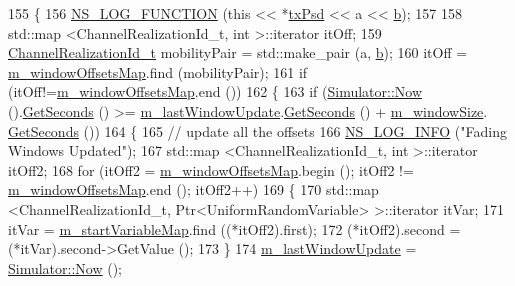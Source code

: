 \begin{DoxyCode}
155 \{
156   \hyperlink{log-macros-disabled_8h_a90b90d5bad1f39cb1b64923ea94c0761}{NS\_LOG\_FUNCTION} (\textcolor{keyword}{this} << *\hyperlink{lte__link__budget_8m_a684fe3101a5e48a5fcc57cab8dbcd1aa}{txPsd} << a << \hyperlink{buildings__pathloss_8m_a21ad0bd836b90d08f4cf640b4c298e7c}{b});
157   
158   std::map <ChannelRealizationId\_t, int >::iterator itOff;
159   \hyperlink{classns3_1_1TraceFadingLossModel_a538fb5e148b837e46a2da767346839d4}{ChannelRealizationId\_t} mobilityPair = std::make\_pair (a,
      \hyperlink{buildings__pathloss_8m_a21ad0bd836b90d08f4cf640b4c298e7c}{b});
160   itOff = \hyperlink{classns3_1_1TraceFadingLossModel_aba701b6e63395fd422f72cd3cd08564a}{m\_windowOffsetsMap}.find (mobilityPair);
161   \textcolor{keywordflow}{if} (itOff!=\hyperlink{classns3_1_1TraceFadingLossModel_aba701b6e63395fd422f72cd3cd08564a}{m\_windowOffsetsMap}.end ())
162     \{
163       \textcolor{keywordflow}{if} (\hyperlink{classns3_1_1Simulator_ac3178fa975b419f7875e7105be122800}{Simulator::Now} ().\hyperlink{classns3_1_1Time_a8f20d5c3b0902d7b4320982f340b57c8}{GetSeconds} () >= 
      \hyperlink{classns3_1_1TraceFadingLossModel_a3e52ec88812339f8ecf070b9f7645a69}{m\_lastWindowUpdate}.\hyperlink{classns3_1_1Time_a8f20d5c3b0902d7b4320982f340b57c8}{GetSeconds} () + \hyperlink{classns3_1_1TraceFadingLossModel_ad872ee7d3fec738e41519fa6562c48fb}{m\_windowSize}.
      \hyperlink{classns3_1_1Time_a8f20d5c3b0902d7b4320982f340b57c8}{GetSeconds} ())
164         \{
165           \textcolor{comment}{// update all the offsets}
166           \hyperlink{group__logging_gafbd73ee2cf9f26b319f49086d8e860fb}{NS\_LOG\_INFO} (\textcolor{stringliteral}{"Fading Windows Updated"});
167           std::map <ChannelRealizationId\_t, int >::iterator itOff2;
168           \textcolor{keywordflow}{for} (itOff2 = \hyperlink{classns3_1_1TraceFadingLossModel_aba701b6e63395fd422f72cd3cd08564a}{m\_windowOffsetsMap}.begin (); itOff2 != 
      \hyperlink{classns3_1_1TraceFadingLossModel_aba701b6e63395fd422f72cd3cd08564a}{m\_windowOffsetsMap}.end (); itOff2++)
169             \{
170               std::map <ChannelRealizationId\_t, Ptr<UniformRandomVariable> >::iterator itVar;
171               itVar = \hyperlink{classns3_1_1TraceFadingLossModel_a7e4e1717c089e89cb5de897687033354}{m\_startVariableMap}.find ((*itOff2).first);
172               (*itOff2).second = (*itVar).second->GetValue ();
173             \}
174           \hyperlink{classns3_1_1TraceFadingLossModel_a3e52ec88812339f8ecf070b9f7645a69}{m\_lastWindowUpdate} = \hyperlink{classns3_1_1Simulator_ac3178fa975b419f7875e7105be122800}{Simulator::Now} ();

\end{DoxyCode}
